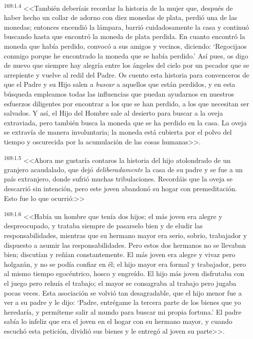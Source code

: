 \par 
\textsuperscript{169:1.4} <<También deberíais recordar la historia de la mujer que, después de haber hecho un collar de adorno con diez monedas de plata, perdió una de las monedas; entonces encendió la lámpara, barrió cuidadosamente la casa y continuó buscando hasta que encontró la moneda de plata perdida. En cuanto encontró la moneda que había perdido, convocó a sus amigos y vecinos, diciendo: `Regocijaos conmigo porque he encontrado la moneda que se había perdido.' Así pues, os digo de nuevo que siempre hay alegría entre los ángeles del cielo por un pecador que se arrepiente y vuelve al redil del Padre. Os cuento esta historia para convenceros de que el Padre y su Hijo salen a \textit{buscar} a aquellos que están perdidos, y en esta búsqueda empleamos todas las influencias que puedan ayudarnos en nuestros esfuerzos diligentes por encontrar a los que se han perdido, a los que necesitan ser salvados. Y así, el Hijo del Hombre sale al desierto para buscar a la oveja extraviada, pero también busca la moneda que se ha perdido en la casa. La oveja se extravía de manera involuntaria; la moneda está cubierta por el polvo del tiempo y oscurecida por la acumulación de las cosas humanas>>.

\par 
\textsuperscript{169:1.5} <<Ahora me gustaría contaros la historia del hijo atolondrado de un granjero acaudalado, que dejó \textit{deliberadamente} la casa de su padre y se fue a un país extranjero, donde sufrió muchas tribulaciones. Recordáis que la oveja se descarrió sin intención, pero este joven abandonó su hogar con premeditación. Esto fue lo que ocurrió:>>

\par 
\textsuperscript{169:1.6} <<Había un hombre que tenía dos hijos; el más joven era alegre y despreocupado, y trataba siempre de pasarselo bien y de eludir las responsabilidades, mientras que su hermano mayor era serio, sobrio, trabajador y dispuesto a asumir las responsabilidades. Pero estos dos hermanos no se llevaban bien; discutían y reñían constantemente. El más joven era alegre y vivaz pero holgazán, y no se podía confiar en él; el hijo mayor era formal y trabajador, pero al mismo tiempo egocéntrico, hosco y engreído. El hijo más joven disfrutaba con el juego pero rehuía el trabajo; el mayor se consagraba al trabajo pero jugaba pocas veces. Esta asociación se volvió tan desagradable, que el hijo menor fue a ver a su padre y le dijo: `Padre, entrégame la tercera parte de los bienes que yo heredaría, y permíteme salir al mundo para buscar mi propia fortuna.' El padre sabía lo infeliz que era el joven en el hogar con su hermano mayor, y cuando escuchó esta petición, dividió sus bienes y le entregó al joven su parte>>.

